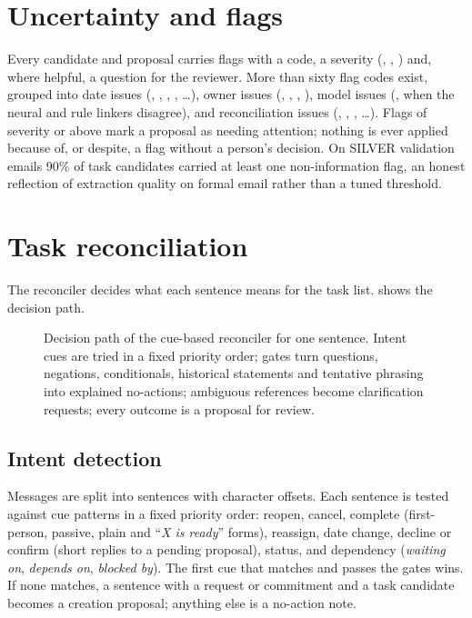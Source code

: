 \section{Uncertainty and flags}
Every candidate and proposal carries flags with a code, a severity (, , ) and, where helpful, a question for the reviewer. More than sixty flag codes exist, grouped into date issues (, , , , \ldots), owner issues (, , , ), model issues (,  when the neural and rule linkers disagree), and reconciliation issues (, , , \ldots). Flags of severity  or above mark a proposal as needing attention; nothing is ever applied because of, or despite, a flag without a person's decision. On SILVER validation emails 90\% of task candidates carried at least one non-information flag, an honest reflection of extraction quality on formal email rather than a tuned threshold.

\section{Task reconciliation}
\label{sec:reconciliation}
The reconciler decides what each sentence means for the task list.  shows the decision path.

\begin{figure}[t]
\centering
{}
\caption[Rule-based reconciliation flowchart]{Decision path of the cue-based reconciler for one sentence. Intent cues are tried in a fixed priority order; gates turn questions, negations, conditionals, historical statements and tentative phrasing into explained no-actions; ambiguous references become clarification requests; every outcome is a proposal for review.}
\label{fig:ruleengine}
\end{figure}

\subsection{Intent detection}
Messages are split into sentences with character offsets. Each sentence is tested against cue patterns in a fixed priority order: reopen, cancel, complete (first-person, passive, plain and ``\emph{X is ready}'' forms), reassign, date change, decline or confirm (short replies to a pending proposal), status, and dependency (\emph{waiting on}, \emph{depends on}, \emph{blocked by}). The first cue that matches and passes the gates wins. If none matches, a sentence with a request or commitment and a task candidate becomes a creation proposal; anything else is a no-action note.

